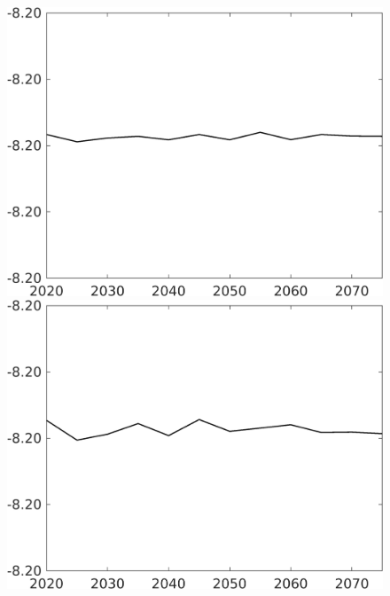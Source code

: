 \documentclass[12pt]{article}
\begin{document}
\begin{figure}[h!!]
\begin{minipage}[]{0.32\textwidth}
		\includegraphics[width=1\textwidth]{../../codding_model/own_basedOnFried/optimalPol_010922_revision/figures/all_13Sept22/CompTaul_Equlab_LFBAUPer_Reg0_hh_spillover0_nsk1_xgr0_knspil0_sep1_countec0_GovRev0_etaa0.79.png}
	\end{minipage}	
	\begin{minipage}[]{0.32\textwidth}
		\includegraphics[width=1\textwidth]{../../codding_model/own_basedOnFried/optimalPol_010922_revision/figures/all_13Sept22/CompTaul_Equlab_LFBAUPer_Reg0_C_spillover0_nsk1_xgr0_knspil0_sep1_countec0_GovRev0_etaa0.79.png}
	\end{minipage}	

\end{figure}
\end{document}
